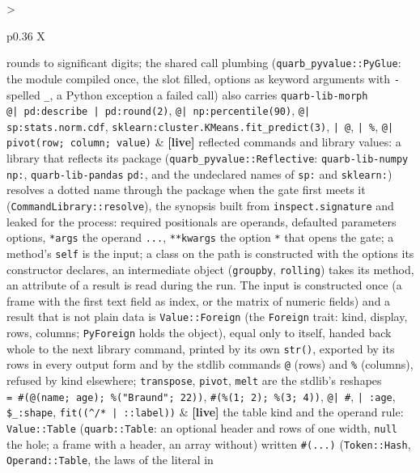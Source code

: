 \documentclass{report}
\newcommand{\live}{\textbf{\textcolor{blue!60!black}{[live]}}\xspace}
\begin{document}
\begin{xltabular}{\textwidth}{>{\raggedright\arraybackslash}p{0.36\textwidth} X}
    rounds to significant digits; the shared call plumbing
    (\texttt{quarb\_pyvalue::PyGlue}: the module compiled once, the
    slot filled, options as keyword arguments with \texttt{-} spelled
    \texttt{\_}, a Python exception a failed call) also carries
    \texttt{quarb-lib-morph} \\
\texttt{@| pd:describe | pd:round(2)}, \texttt{@| np:percentile(90)},
\texttt{@| sp:stats.norm.cdf}, \texttt{sklearn:cluster.KMeans.fit\_predict(3)},
\texttt{| @}, \texttt{| \%}, \texttt{@| pivot(row; column; value)}
  & \live reflected commands and library values: a library that
    reflects its package (\texttt{quarb\_pyvalue::Reflective}:
    \texttt{quarb-lib-numpy} \texttt{np:}, \texttt{quarb-lib-pandas}
    \texttt{pd:}, and the undeclared names of \texttt{sp:} and
    \texttt{sklearn:}) resolves a dotted name through the package
    when the gate first meets it (\texttt{CommandLibrary::resolve}),
    the synopsis built from \texttt{inspect.signature} and leaked for
    the process: required positionals are operands, defaulted
    parameters options, \texttt{*args} the operand \texttt{...},
    \texttt{**kwargs} the option \texttt{*} that opens the gate; a
    method's \texttt{self} is the input; a class on the path is
    constructed with the options its constructor declares, an
    intermediate object (\texttt{groupby}, \texttt{rolling}) takes
    its method, an attribute of a result is read during the run. The
    input is constructed once (a frame with the first text field as
    index, or the matrix of numeric fields) and a result that is not
    plain data is \texttt{Value::Foreign} (the \texttt{Foreign} trait:
    kind, display, rows, columns; \texttt{PyForeign} holds the
    object), equal only to itself, handed back whole to the next
    library command, printed by its own \texttt{str()}, exported by
    its rows in every output form and by the stdlib commands
    \texttt{@} (rows) and \texttt{\%} (columns), refused by kind
    elsewhere; \texttt{transpose}, \texttt{pivot}, \texttt{melt} are
    the stdlib's reshapes \\
\texttt{= \#(@(name; age); \%("Braund"; 22))}, \texttt{\#(\%(1; 2); \%(3; 4))}, \texttt{@| \#},
\texttt{| :age}, \texttt{\$\_:shape},
\texttt{fit((\textasciicircum{}/* | ::label))}
  & \live the table kind and the operand rule: \texttt{Value::Table}
    (\texttt{quarb::Table}: an optional header and rows of one width,
    \texttt{null} the hole; a frame with a header, an array without)
    written \texttt{\#(...)} (\texttt{Token::Hash},
    \texttt{Operand::Table}, the laws of the literal in

\end{xltabular}
\end{document}
